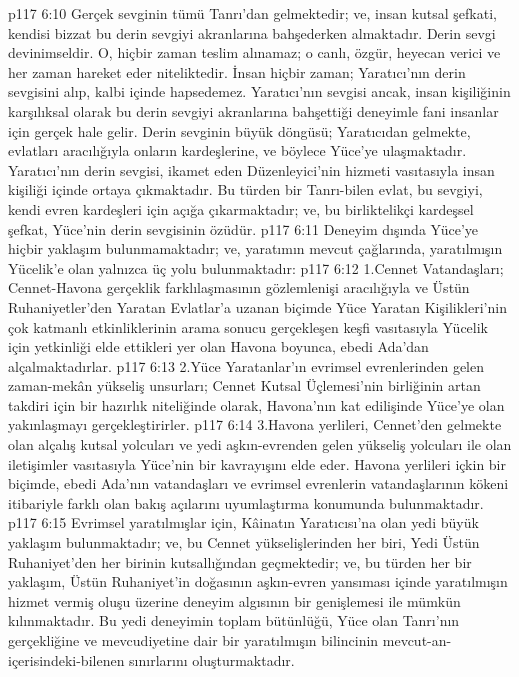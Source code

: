 \vs p117 6:10 Gerçek sevginin tümü Tanrı’dan gelmektedir; ve, insan kutsal şefkati, kendisi bizzat bu derin sevgiyi akranlarına bahşederken almaktadır. Derin sevgi devinimseldir. O, hiçbir zaman teslim alınamaz; o canlı, özgür, heyecan verici ve her zaman hareket eder niteliktedir. İnsan hiçbir zaman; Yaratıcı’nın derin sevgisini alıp, kalbi içinde hapsedemez. Yaratıcı’nın sevgisi ancak, insan kişiliğinin karşılıksal olarak bu derin sevgiyi akranlarına bahşettiği deneyimle fani insanlar için gerçek hale gelir. Derin sevginin büyük döngüsü; Yaratıcıdan gelmekte, evlatları aracılığıyla onların kardeşlerine, ve böylece Yüce’ye ulaşmaktadır. Yaratıcı’nın derin sevgisi, ikamet eden Düzenleyici’nin hizmeti vasıtasıyla insan kişiliği içinde ortaya çıkmaktadır. Bu türden bir Tanrı\hyp{}bilen evlat, bu sevgiyi, kendi evren kardeşleri için açığa çıkarmaktadır; ve, bu birliktelikçi kardeşsel şefkat, Yüce’nin derin sevgisinin özüdür.
\vs p117 6:11 Deneyim dışında Yüce’ye hiçbir yaklaşım bulunmamaktadır; ve, yaratımın mevcut çağlarında, yaratılmışın Yücelik’e olan yalnızca üç yolu bulunmaktadır:
\vs p117 6:12 1.\bibnobreakspace Cennet Vatandaşları; Cennet\hyp{}Havona gerçeklik farklılaşmasının gözlemlenişi aracılığıyla ve Üstün Ruhaniyetler’den Yaratan Evlatlar’a uzanan biçimde Yüce Yaratan Kişilikleri’nin çok katmanlı etkinliklerinin arama sonucu gerçekleşen keşfi vasıtasıyla Yücelik için yetkinliği elde ettikleri yer olan Havona boyunca, ebedi Ada’dan alçalmaktadırlar.
\vs p117 6:13 2.\bibnobreakspace Yüce Yaratanlar’ın evrimsel evrenlerinden gelen zaman\hyp{}mekân yükseliş unsurları; Cennet Kutsal Üçlemesi’nin birliğinin artan takdiri için bir hazırlık niteliğinde olarak, Havona’nın kat edilişinde Yüce’ye olan yakınlaşmayı gerçekleştirirler.
\vs p117 6:14 3.\bibnobreakspace Havona yerlileri, Cennet’den gelmekte olan alçalış kutsal yolcuları ve yedi aşkın\hyp{}evrenden gelen yükseliş yolcuları ile olan iletişimler vasıtasıyla Yüce’nin bir kavrayışını elde eder. Havona yerlileri içkin bir biçimde, ebedi Ada’nın vatandaşları ve evrimsel evrenlerin vatandaşlarının kökeni itibariyle farklı olan bakış açılarını uyumlaştırma konumunda bulunmaktadır.
\vs p117 6:15 Evrimsel yaratılmışlar için, Kâinatın Yaratıcısı’na olan yedi büyük yaklaşım bulunmaktadır; ve, bu Cennet yükselişlerinden her biri, Yedi Üstün Ruhaniyet’den her birinin kutsallığından geçmektedir; ve, bu türden her bir yaklaşım, Üstün Ruhaniyet’in doğasının aşkın\hyp{}evren yansıması içinde yaratılmışın hizmet vermiş oluşu üzerine deneyim algısının bir genişlemesi ile mümkün kılınmaktadır. Bu yedi deneyimin toplam bütünlüğü, Yüce olan Tanrı’nın gerçekliğine ve mevcudiyetine dair bir yaratılmışın bilincinin mevcut\hyp{}an\hyp{}içerisindeki\hyp{}bilenen sınırlarını oluşturmaktadır.
